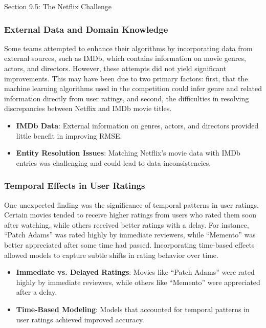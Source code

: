 \begin{notes}{Section 9.5: The Netflix Challenge}
    \subsubsection*{External Data and Domain Knowledge}
    
    Some teams attempted to enhance their algorithms by incorporating data from external sources, such as IMDb, which contains information on movie genres, actors, and directors. However, these attempts 
    did not yield significant improvements. This may have been due to two primary factors: first, that the machine learning algorithms used in the competition could infer genre and related information directly 
    from user ratings, and second, the difficulties in resolving discrepancies between Netflix and IMDb movie titles.
    
    \begin{highlight}
        \begin{itemize}
            \item \textbf{IMDb Data}: External information on genres, actors, and directors provided little benefit in improving RMSE.
            \item \textbf{Entity Resolution Issues}: Matching Netflix's movie data with IMDb entries was challenging and could lead to data inconsistencies.
        \end{itemize}
    \end{highlight}
    
    \subsubsection*{Temporal Effects in User Ratings}
    
    One unexpected finding was the significance of temporal patterns in user ratings. Certain movies tended to receive higher ratings from users who rated them soon after watching, while others received better 
    ratings with a delay. For instance, “Patch Adams” was rated highly by immediate reviewers, while “Memento” was better appreciated after some time had passed. Incorporating time-based effects allowed 
    models to capture subtle shifts in rating behavior over time.
    
    \begin{highlight}
        \begin{itemize}
            \item \textbf{Immediate vs. Delayed Ratings}: Movies like “Patch Adams” were rated highly by immediate reviewers, while others like “Memento” were appreciated after a delay.
            \item \textbf{Time-Based Modeling}: Models that accounted for temporal patterns in user ratings achieved improved accuracy.
        \end{itemize}
    \end{highlight}
    

\end{notes}
